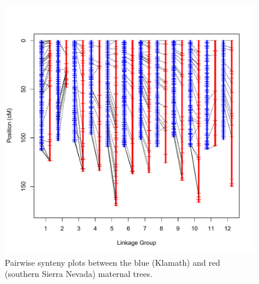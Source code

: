 \documentclass[smallextended]{svjour3}
\begin{document}
\begin{figure}[ht]
  \centering
  \includegraphics[width=\textwidth]{red_blue_synteny}
  \caption{Pairwise synteny plots between the blue (Klamath) and red (southern
    Sierra Nevada) maternal trees.}
  \label{f:con}
\end{figure}
\end{document}
